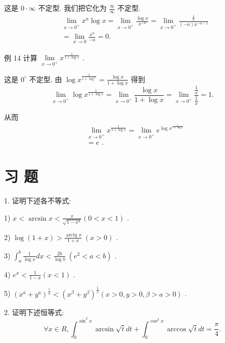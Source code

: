 这是 $0 \cdot  \infty$ 不定型. 我们把它化为 $\frac{\infty }{\infty }$ 不定型.
\begin{align*}
	&\mathop{\lim }\limits_{{x \rightarrow  {0}^{ + }}}{x}^{a}\log x = \mathop{\lim }\limits_{{x \rightarrow  {0}^{ + }}}\frac{\log x}{{x}^{-a}} = \mathop{\lim }\limits_{{x \rightarrow  {0}^{ + }}}\frac{\frac{1}{x}}{\left( {-a}\right) {x}^{-a - 1}}\\
	&= \mathop{\lim }\limits_{{x \rightarrow  0}}\frac{{x}^{a}}{-a} = 0.
\end{align*}

例 14 计算 $\mathop{\lim }\limits_{{x \rightarrow  {0}^{ + }}}{x}^{\frac{1}{1 + \log x}}$ .

这是 ${0}^{ \circ  }$ 不定型. 由 $\log {x}^{\frac{1}{1 + {\log }^{x}}} = \frac{\log x}{1 + \log x}$ 得到
$$\mathop{\lim }\limits_{{x \rightarrow  {0}^{ + }}}\log {x}^{\frac{1}{1 + \log x}} = \mathop{\lim }\limits_{{x \rightarrow  {0}^{ + }}}\frac{\log x}{1 + \log x} = \mathop{\lim }\limits_{{x \rightarrow  {0}^{ + }}}\frac{\frac{1}{x}}{\frac{1}{x}} = 1.$$

从而
\begin{align*}
	&\mathop{\lim }\limits_{{x \rightarrow  {0}^{ + }}}{x}^{\frac{1}{1 + \log x}} = \mathop{\lim }\limits_{{x \rightarrow  {0}^{ + }}}{e}^{\log {x}^{\frac{1}{1 + \log x}}}\\
	&= e\text{ . }
\end{align*}

\section*{习 题}

1. 证明下述各不等式:

1) $x < \arcsin x < \frac{x}{\sqrt{1 - {x}^{2}}}\left( {0 < x < 1}\right)$ .

2) $\log \left( {1 + x}\right)  > \frac{\operatorname{arctg}x}{1 + x}\;\left( {x > 0}\right)$ .

3) ${\int }_{a}^{b}\frac{1}{\log x}{dx} < \frac{2b}{\log b}\;\left( {{e}^{2} < a < b}\right)$ .

4) ${e}^{x} < \frac{1}{1 - x}\left( {x < 1}\right)$ .

5) ${\left( {x}^{a} + {y}^{a}\right) }^{\frac{1}{\alpha }} < {\left( {x}^{\beta } + {y}^{\beta }\right) }^{\frac{1}{\beta }}\left( {x > 0,y > 0,\beta  > a > 0}\right)$ .

2. 证明下述恒等式:
$$\forall x \in  R,{\int }_{0}^{{\sin }^{2}x}\arcsin \sqrt{t}{dt} + {\int }_{0}^{{\cos }^{2}x}\arccos \sqrt{t}{dt} = \frac{\pi }{4}.$$

